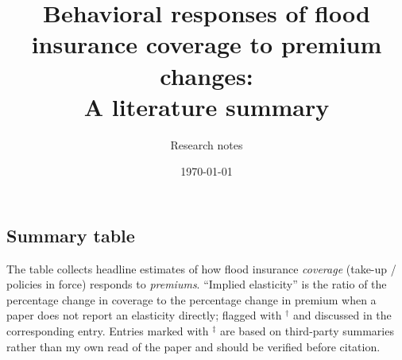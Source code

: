 \documentclass[11pt]{article}
\title{Behavioral responses of flood insurance coverage to premium changes:\\
A literature summary}
\author{Research notes}
\date{\today}
\begin{document}
\maketitle

\begin{landscape}
\section*{Summary table}

The table collects headline estimates of how flood insurance \emph{coverage}
(take-up / policies in force) responds to \emph{premiums}. ``Implied elasticity'' is the
ratio of the percentage change in coverage to the percentage change in premium when a
paper does not report an elasticity directly; flagged with $^\dagger$ and discussed in
the corresponding entry. Entries marked with $^\ddagger$ are based on third-party
summaries rather than my own read of the paper and should be verified before citation.

\vspace{1em}


\end{landscape}
\end{document}
